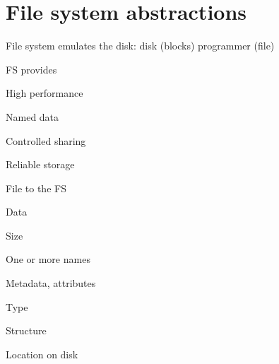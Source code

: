 \section{File system abstractions}
\enumstart
	\item File system emulates the disk: disk (blocks) \arrow programmer (file)
	\item FS provides
	\enumstart
		\item High performance
		\item Named data
		\item Controlled sharing
		\item Reliable storage
	\enumend
	\item File to the FS
	\enumstart
		\item Data
		\item Size
		\item One or more names
		\item Metadata, attributes
		\item Type
		\item Structure
		\item Location on disk
	\enumend
\enumend


